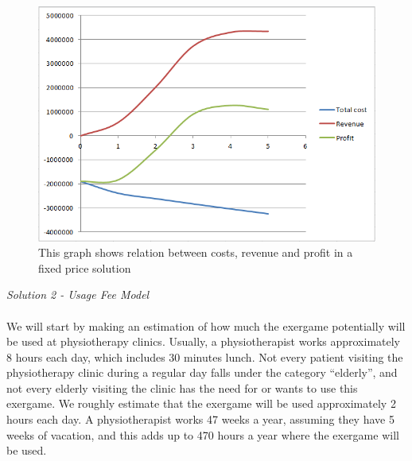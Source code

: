 \begin{figure}
\begin{center}
\includegraphics[scale=0.8]{profitfixed}
\caption[Profit, Revenue and Cost for a Fixed Price Solution]{This graph shows relation between costs, revenue and profit in a fixed price solution}
\label{fig:ProfitFixed}
\end{center}
\end{figure}
\emph{Solution 2 - Usage Fee Model}\\ \\
We will start by making an estimation of how much the exergame potentially will be used at physiotherapy clinics. Usually, a physiotherapist works approximately 8 hours each day, which includes 30 minutes lunch. Not every patient visiting the physiotherapy clinic during a regular day falls under the category “elderly”, and not every elderly visiting the clinic has the need for or wants to use this exergame. We roughly estimate that the exergame will be used approximately 2 hours each day. A physiotherapist works 47 weeks a year, assuming they have 5 weeks of vacation, and this adds up to 470 hours a year where the exergame will be used.\\ \\
